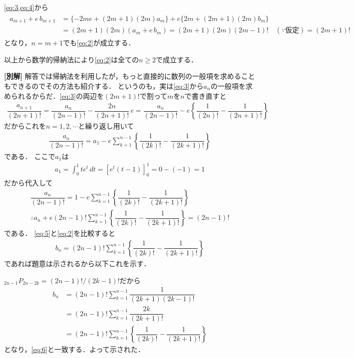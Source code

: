 \documentclass[../../main.tex]{subfiles}
\begin{document}
\cref{eq:3,eq:4}から
\begin{align}
  \begin{split}
    a_{m+1}+e\,b_{m+1}
    &=\{-2me+(2m+1)(2m)a_m\}+e\{2m+(2m+1)(2m)b_m\} \\
    &=(2m+1)(2m)(a_m+e\,b_m)=(2m+1)(2m)(2m-1)!\quad(\because\text{仮定})=(2m+1)!
  \end{split}
\end{align}
となり，$n=m+1$でも\cref{eq:2}が成立する．

以上から数学的帰納法により\cref{eq:2}は全ての$n\ge2$で成立する．

{\bf [別解]}
解答では帰納法を利用したが，もっと直接的に数列の一般項を求めることもできるのでその方法も紹介する．
というのも，実は\cref{eq:3}から$a_n$の一般項を求められるからだ．\cref{eq:3}の両辺を$(2m+1)!$で割って$m$を$n$で書き直すと
\begin{align}
  \dfrac{a_{n+1}}{(2n+1)!}=\dfrac{a_n}{(2n-1)!}-\dfrac{2n}{(2n+1)!}\,e=\dfrac{a_n}{(2n-1)!}-e\left\{\dfrac{1}{(2n)!}-\dfrac{1}{(2n+1)!}\right\}
\end{align}
だからこれを$n=1,2,\cdots$と繰り返し用いて
\begin{align}
  \dfrac{a_n}{(2n-1)!}=a_1-e\sum_{k=1}^{n-1}\left\{\dfrac{1}{(2k)!}-\dfrac{1}{(2k+1)!}\right\}
\end{align}
である．
ここで$a_1$は
\begin{align}
  a_1=\int_0^1te^t\,dt=\left[e^t(t-1)\right]_0^1=0-(-1)=1
\end{align}
だから代入して
\begin{align}
  \dfrac{a_n}{(2n-1)!}=1-e\sum_{k=1}^{n-1}\left\{\dfrac{1}{(2k)!}-\dfrac{1}{(2k+1)!}\right\} \\
  \therefore
  a_n + e(2n-1)!\sum_{k=1}^{n-1}\left\{\dfrac{1}{(2k)!}-\dfrac{1}{(2k+1)!}\right\} = (2n-1)! \label{eq:5}
\end{align}
である．
\cref{eq:5}と\cref{eq:2}を比較すると
\begin{align}
  b_n = (2n-1)!\sum_{k=1}^{n-1}\left\{\dfrac{1}{(2k)!}-\dfrac{1}{(2k+1)!}\right\} \label{eq:6}
\end{align}
であれば題意は示されるから以下これを示す．

${}_{2n-1}P_{2n-2k}=(2n-1)!/(2k-1)!$だから
\begin{align}
  b_n
  &=(2n-1)!\sum_{k=1}^{n-1}\dfrac{1}{(2k+1)(2k-1)!} \\
  &=(2n-1)!\sum_{k=1}^{n-1}\dfrac{2k}{(2k+1)!} \\
  &=(2n-1)!\sum_{k=1}^{n-1}\left\{\dfrac{1}{(2k)!}-\dfrac{1}{(2k+1)!}\right\} \label{eq:7}
\end{align}
となり，\cref{eq:6}と一致する．よって示された．

\newpage
\end{document}
